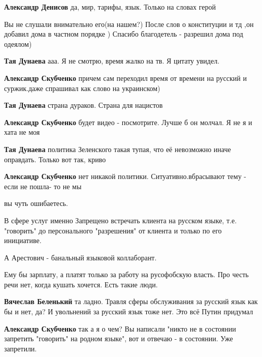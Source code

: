\begin{itemize}
\begin{itemize} %
\textbf{Александр Денисов} да, мир, тарифы, язык. Только на словах герой
\end{itemize} %


Вы не слушали внимательно его(на нашем?)
После слов о конституции и тд ,он добавил дома в частном порядке )
Спасибо благодетель - разрешил дома под одеялом)

\begin{itemize} %
\textbf{Тая Дунаева} ааа. Я не смотрю, время жалко на тв. Я цитату увидел.

\textbf{Александр Скубченко} причем сам переходил время от времени на русский и суржик.даже спрашивал как слово на украинском)

\textbf{Тая Дунаева} страна дураков. Страна для нацистов

\textbf{Александр Скубченко} будет видео - посмотрите.
Лучше б он молчал.
Я не я и хата не моя

\textbf{Тая Дунаева} политика Зеленского такая тупая, что её невозможно иначе оправдать. Только вот так, криво

\textbf{Александр Скубченко} нет никакой политики.
Ситуативно.вбрасывают тему - если не пошла- то не мы
\end{itemize} %


вы чуть ошибаетесь.

В сфере услуг именно Запрещено встречать клиента на русском языке, т.е.
"говорить" до персонального "разрешения" от клиента и только по его инициативе.

А Арестович - банальный языковой коллаборант.

Ему бы зарплату, а платят только за работу на русофобскую власть. Про честь
речи нет, когда кушать хочется. Есть такие люди.

\begin{itemize} %
\textbf{Вячеслав Беленький} та ладно. Травля сферы обслуживания за русский язык как бы и нет, да? И увольнений за русский язык тоже нет. Это всё Путин придумал

\textbf{Александр Скубченко} так а я о чем?
Вы написали "никто не в состоянии запретить "говорить" на родном языке", вот и отвечаю - в состоянии. Уже запретили.


\end{itemize}
\end{itemize}
